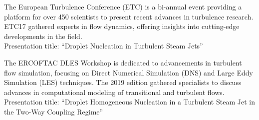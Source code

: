 	\divider

	The European Turbulence Conference (ETC) is a bi-annual event providing a platform for over 450 scientists to present recent advances in turbulence research. ETC17 gathered experts in flow dynamics, offering insights into cutting-edge developments in the field. \\
	\medskip
	Presentation title: ``Droplet Nucleation in Turbulent Steam Jets''

	\divider

	The ERCOFTAC DLES Workshop is dedicated to advancements in turbulent flow simulation, focusing on Direct Numerical Simulation (DNS) and Large Eddy Simulation (LES) techniques. The 2019 edition gathered specialists to discuss advances in computational modeling of transitional and turbulent flows. \\
	\medskip
	Presentation title: ``Droplet Homogeneous Nucleation in a Turbulent Steam Jet in the Two-Way Coupling Regime''

	\bigskip




	\nocite{*}





	\printbibliography[heading=pubtype,title={\printinfo{\faUsers}{Conference Proceedings}},type=inproceedings]

